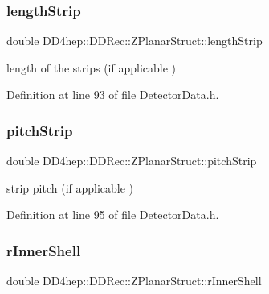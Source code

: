 \hypertarget{struct_d_d4hep_1_1_d_d_rec_1_1_z_planar_struct_ae17170e893c4b0a60f3757bffac7b3c9}{}\label{struct_d_d4hep_1_1_d_d_rec_1_1_z_planar_struct_ae17170e893c4b0a60f3757bffac7b3c9} 
\subsubsection{\texorpdfstring{length\+Strip}{lengthStrip}}
{\footnotesize\ttfamily double D\+D4hep\+::\+D\+D\+Rec\+::\+Z\+Planar\+Struct\+::length\+Strip}



length of the strips (if applicable ) 



Definition at line 93 of file Detector\+Data.\+h.

\hypertarget{struct_d_d4hep_1_1_d_d_rec_1_1_z_planar_struct_a7367121d185ed521c9fff8bb437de11a}{}\label{struct_d_d4hep_1_1_d_d_rec_1_1_z_planar_struct_a7367121d185ed521c9fff8bb437de11a} 
\subsubsection{\texorpdfstring{pitch\+Strip}{pitchStrip}}
{\footnotesize\ttfamily double D\+D4hep\+::\+D\+D\+Rec\+::\+Z\+Planar\+Struct\+::pitch\+Strip}



strip pitch (if applicable ) 



Definition at line 95 of file Detector\+Data.\+h.

\hypertarget{struct_d_d4hep_1_1_d_d_rec_1_1_z_planar_struct_a34989dd51686b6107bf9d322eabf76b0}{}\label{struct_d_d4hep_1_1_d_d_rec_1_1_z_planar_struct_a34989dd51686b6107bf9d322eabf76b0} 
\subsubsection{\texorpdfstring{r\+Inner\+Shell}{rInnerShell}}
{\footnotesize\ttfamily double D\+D4hep\+::\+D\+D\+Rec\+::\+Z\+Planar\+Struct\+::r\+Inner\+Shell}



